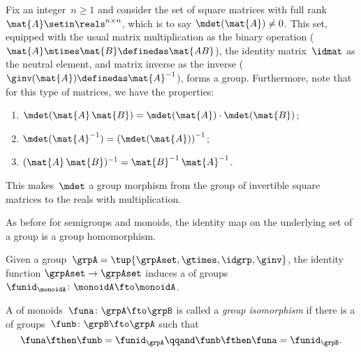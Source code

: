 \begin{example}
    \label{exa:square-full}
    Fix an integer~$n\geq1 $ and consider the set of square matrices with full rank~$\mat{A} \setin \reals^{n\times n}$, which is to say $\mdet(\mat{A}) \neq 0$.
    This set, equipped with the usual matrix multiplication as the binary operation ($\mat{A}\mtimes \mat{B}\definedas \mat{AB}$), the identity matrix~$\idmat$ as the neutral element, and matrix inverse as the inverse ($\ginv(\mat{A})\definedas \mat{A}^{-1}$), forms a group.
    Furthermore, note that for this type of matrices, we have the properties:
    \begin{enumerate}
        \item $\mdet(\mat{A} \, \mat{B}) = \mdet(\mat{A}) \cdot  \mdet(\mat{B})$;
        \item $\mdet(\mat{A}^{-1}) = \left( \mdet(\mat{A}) \right) ^ {-1}$;
        \item $(\mat{A}\,\mat{B})^{-1} = {\mat{B}^{-1} \, \mat{A}^{-1}}$.
    \end{enumerate}
    This makes~$\mdet$ a group morphism from the group of invertible square matrices to the reals with multiplication.
\end{example}

As before for semigroups and monoids, the identity map on the underlying set of a group is a group homomorphism.

\begin{ctdefinition}
    \label{def:identity-grp-mor}
    Given a group~$\grpA =  \tup{\grpAset, \gtimes, \idgrp, \ginv}$, the identity function $\grpAset \to \grpAset$ induces a \whomo of groups~$\funid_\monoidA\colon \monoidA \fto \monoidA$.
\end{ctdefinition}

\begin{ctdefinition}
    \label{def:grp-iso}
    A \whomo of monoids~$\funa\colon \grpA \fto \grpB$ is called a \emph{group isomorphism} if there is a \whomo of groups~$\funb\colon \grpB \fto \grpA$ such that
    \begin{equation}
        \funa \fthen \funb = \funid_\grpA \qqand \funb \fthen \funa = \funid_\grpB.
    \end{equation}
\end{ctdefinition}


